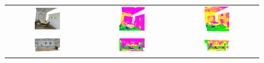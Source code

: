 \begin{figure}[h!]
\begin{tabular}{ccc}
            \includegraphics[width=0.33\textwidth, height=0.18\textheight]{images/seg_output/s3dis_DE/S3DIS_2_RGB.pdf} &
            \includegraphics[width=0.33\textwidth, height=0.18\textheight]{images/seg_output/s3dis_DE/S3DIS_2_Pred.pdf}&
            \includegraphics[width=0.33\textwidth, height=0.18\textheight]{images/seg_output/s3dis_DE/ocroom_1.pdf} \\
            
            \includegraphics[width=0.33\textwidth, height=0.18\textheight]{images/seg_output/s3dis_DE/S3DIS_3_RGB.pdf} &
            \includegraphics[width=0.33\textwidth, height=0.18\textheight]{images/seg_output/s3dis_DE/S3DIS_3_Pred.pdf}&
            \includegraphics[width=0.33\textwidth, height=0.18\textheight]{images/seg_output/s3dis_DE/opantry_1.pdf} \\


\end{tabular}
\end{figure}
